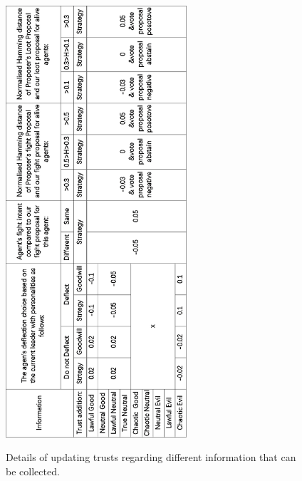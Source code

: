 \newpage

\begin{figure}[htb]
    \caption{Details of updating trusts regarding different information that can be collected.}
    \includegraphics[width=0.60\textwidth]{008_team_5_agent_design/images/Information2Trusts.png}
    \label{fig:Information2Trusts}
\end{figure}
\clearpage

